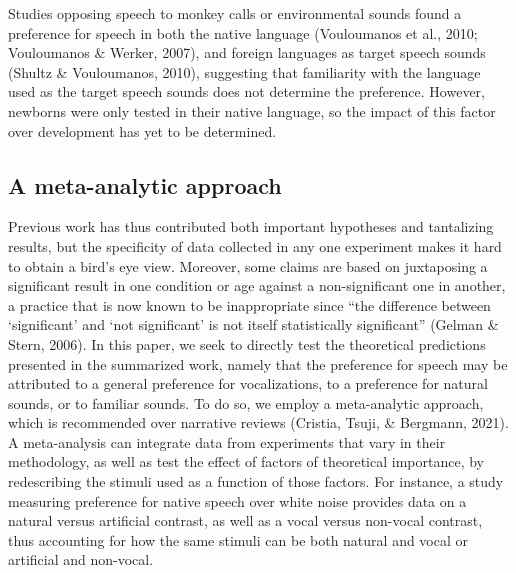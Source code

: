 \documentclass[
  man,mask,floatsintext]{apa6}
\begin{document}
Studies opposing speech to monkey calls or environmental sounds found a preference for speech in both the native language (Vouloumanos et al., 2010; Vouloumanos \& Werker, 2007), and foreign languages as target speech sounds (Shultz \& Vouloumanos, 2010), suggesting that familiarity with the language used as the target speech sounds does not determine the preference. However, newborns were only tested in their native language, so the impact of this factor over development has yet to be determined.

\hypertarget{a-meta-analytic-approach}{%
\subsection{A meta-analytic approach}\label{a-meta-analytic-approach}}

Previous work has thus contributed both important hypotheses and tantalizing results, but the specificity of data collected in any one experiment makes it hard to obtain a bird's eye view. Moreover, some claims are based on juxtaposing a significant result in one condition or age against a non-significant one in another, a practice that is now known to be inappropriate since ``the difference between `significant' and `not significant' is not itself statistically significant'' (Gelman \& Stern, 2006). In this paper, we seek to directly test the theoretical predictions presented in the summarized work, namely that the preference for speech may be attributed to a general preference for vocalizations, to a preference for natural sounds, or to familiar sounds. To do so, we employ a meta-analytic approach, which is recommended over narrative reviews (Cristia, Tsuji, \& Bergmann, 2021). A meta-analysis can integrate data from experiments that vary in their methodology, as well as test the effect of factors of theoretical importance, by redescribing the stimuli used as a function of those factors. For instance, a study measuring preference for native speech over white noise provides data on a natural versus artificial contrast, as well as a vocal versus non-vocal contrast, thus accounting for how the same stimuli can be both natural and vocal or artificial and non-vocal.
\end{document}
